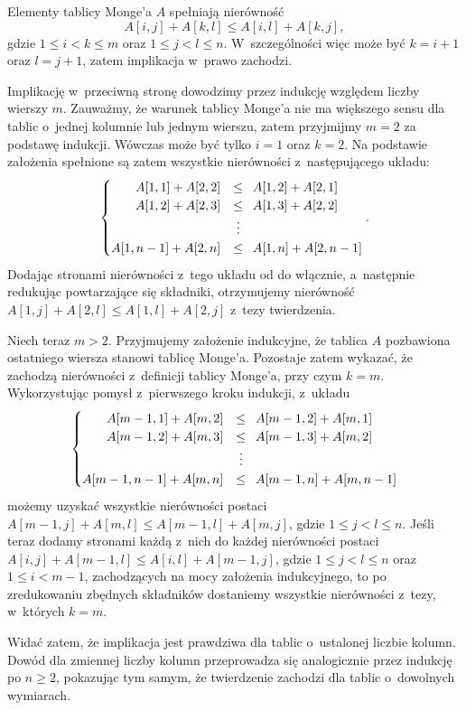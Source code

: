 
\subproblem %
Elementy tablicy Monge'a $A$ spełniają nierówność
\[
	A[i,j]+A[k,l] \le A[i,l]+A[k,j],
\]
gdzie $1\le i<k\le m$ oraz $1\le j<l\le n$. W~szczególności więc może być $k=i+1$ oraz $l=j+1$, zatem implikacja w~prawo zachodzi.

Implikację w~przeciwną stronę dowodzimy przez indukcję względem liczby wierszy $m$. Zauważmy, że warunek tablicy Monge'a nie ma większego sensu dla tablic o~jednej kolumnie lub jednym wierszu, zatem przyjmijmy $m=2$ za podstawę indukcji. Wówczas może być tylko $i=1$ oraz $k=2$. Na podstawie założenia spełnione są zatem wszystkie nierówności z~następującego układu:
\[
	\begin{cases}
		\hfill A[1,1]+A[2,2] &\le\,\,\, A[1,2]+A[2,1] \\
		\hfill A[1,2]+A[2,3] &\le\,\,\, A[1,3]+A[2,2] \\
		& \;\vdots \\
		A[1,n-1]+A[2,n] &\le\,\,\, A[1,n]+A[2,n-1] \\
	\end{cases}.
\]
Dodając stronami nierówności z~tego układu od  do  włącznie, a~następnie redukując powtarzające się składniki, otrzymujemy nierówność $A[1,j]+A[2,l]\le A[1,l]+A[2,j]$ z~tezy twierdzenia.

Niech teraz $m>2$. Przyjmujemy założenie indukcyjne, że tablica $A$ pozbawiona ostatniego wiersza stanowi tablicę Monge'a. Pozostaje zatem wykazać, że zachodzą nierówności z~definicji tablicy Monge'a, przy czym $k=m$. Wykorzystując pomysł z~pierwszego kroku indukcji, z~układu
\[
	\begin{cases}
		\hfill A[m-1,1]+A[m,2] &\le\,\,\, A[m-1,2]+A[m,1] \\
		\hfill A[m-1,2]+A[m,3] &\le\,\,\, A[m-1,3]+A[m,2] \\
		& \;\vdots \\
		A[m-1,n-1]+A[m,n] &\le\,\,\, A[m-1,n]+A[m,n-1] \\
	\end{cases}
\]
możemy uzyskać wszystkie nierówności postaci $A[m-1,j]+A[m,l]\le A[m-1,l]+A[m,j]$, gdzie $1\le j<l\le n$. Jeśli teraz dodamy stronami każdą z~nich do każdej nierówności postaci $A[i,j]+A[m-1,l]\le A[i,l]+A[m-1,j]$, gdzie $1\le j<l\le n$ oraz $1\le i<m-1$, zachodzących na mocy założenia indukcyjnego, to po zredukowaniu zbędnych składników dostaniemy wszystkie nierówności z~tezy, w~których $k=m$.

Widać zatem, że implikacja jest prawdziwa dla tablic o~ustalonej liczbie kolumn. Dowód dla zmiennej liczby kolumn przeprowadza się analogicznie przez indukcję po $n\ge2$, pokazując tym samym, że twierdzenie zachodzi dla tablic o~dowolnych wymiarach.

